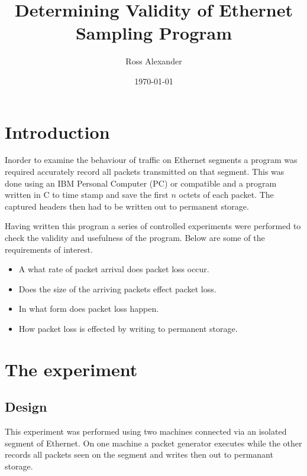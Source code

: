 
\title{Determining Validity of Ethernet Sampling Program}
\author{Ross Alexander}
\date{\today}



\maketitle

\section{Introduction}

Inorder to examine the behaviour of traffic on Ethernet segments a
program was required accurately record all packets transmitted on that
segment.  This was done using an IBM Personal Computer (PC) or
compatible and a program written in C to time stamp and save the first
$n$ octets of each packet.  The captured headers then had to be
written out to permanent storage.

Having written this program a series of controlled experiments were
performed to check the validity and usefulness of the program.  Below
are some of the requirements of interest.

\begin{itemize}
\item	A what rate of packet arrival does packet loss occur.

\item	Does the size of the arriving packets effect packet loss.

\item	In what form does packet loss happen.

\item	How packet loss is effected by writing to permanent storage.
\end{itemize}

\section{The experiment}

\subsection{Design}

This experiment was performed using two machines connected via an
isolated segment of Ethernet.  On one machine a packet generator
executes while the other records all packets seen on the segment and
writes then out to permanant storage.

